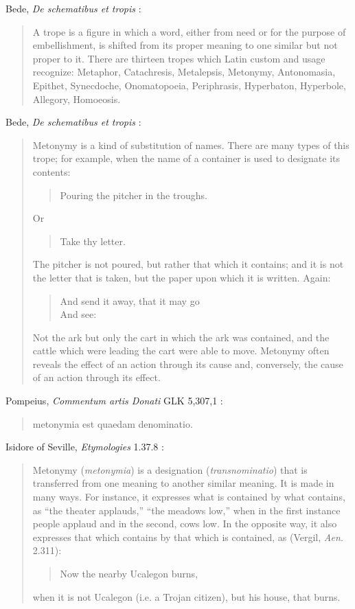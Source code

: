 \documentclass{article}
\begin{document}
Bede, {\em De schematibus et tropis} \cite[p.~244]{tanenhaus}:

\begin{quote}
A trope is a figure in which a word,
either from need or for the purpose of embellishment, is shifted from its proper meaning to one similar but not proper to it. There are thirteen tropes which Latin custom and usage recognize: Metaphor, Catachresis, Metalepsis, Metonymy, Antonomasia, Epithet, Synecdoche, Onomatopoeia, Periphrasis, Hyperbaton, Hyperbole, Allegory, Homoeosis.
\end{quote}

Bede, {\em De schematibus et tropis} \cite[p.~246]{tanenhaus}:

\begin{quote}
Metonymy is a kind of substitution of names. There are many types of this trope; for example, when the name of a container is used to designate its contents:
\begin{quote}
Pouring the pitcher in the troughs.
\end{quote}
Or
\begin{quote}
Take thy letter.
\end{quote}
The pitcher is not poured, but rather that which it contains; and it is not the letter that is taken, but the paper upon which it is written. Again:
\begin{quote}
And send it away, that it may go\\
And see:
\end{quote}
Not the ark but only the cart in which the ark was contained, and the cattle which were leading the cart were able to move. Metonymy often reveals the effect of an action through its cause and, conversely, the cause of an action through its effect.
\end{quote}

Pompeius, {\em Commentum artis Donati} GLK 5,307,1 \cite{GLK}:

\begin{quote}
metonymia est quaedam denominatio.
\end{quote}

Isidore of Seville, {\em Etymologies} 1.37.8 \cite[p.~61]{isidore}:

\begin{quote}
Metonymy ({\em metonymia}) is a designation ({\em transnominatio}) that is transferred from one meaning to another similar meaning. It is made in many ways. For instance, it expresses what is contained by what contains, as ``the theater applauds,'' ``the meadows low,'' when in the first instance people applaud and in the second, cows low. In the opposite way, it also expresses that which contains by that which is contained, as (Vergil, {\em Aen.} 2.311):
\begin{quote}
Now the nearby Ucalegon burns,
\end{quote}
when it is not Ucalegon (i.e. a Trojan citizen), but his house, that burns. 
\end{quote}
\end{document}
